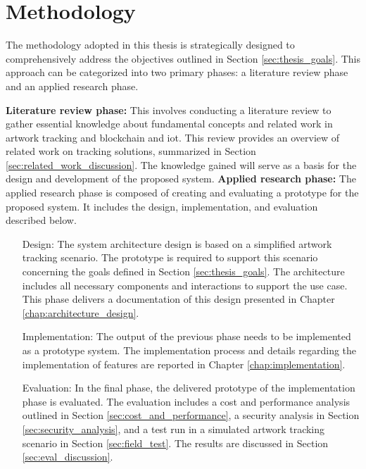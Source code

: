 \section{Methodology}
The methodology adopted in this thesis is strategically designed to comprehensively address the objectives outlined in Section \ref{sec:thesis_goals}. This approach can be categorized into two primary phases: a literature review phase and an applied research phase.

\textbf{Literature review phase:} This involves conducting a literature review to gather essential knowledge about fundamental concepts and related work in artwork tracking and blockchain and \gls{iot}. This review provides an overview of related work on tracking solutions, summarized in Section \ref{sec:related_work_discussion}. The knowledge gained will serve as a basis for the design and development of the proposed system.
\clearpage
\textbf{Applied research phase:} The applied research phase is composed of creating and evaluating a prototype for the proposed system. It includes the design, implementation, and evaluation described below.

\begin{itemize}[font=\itshape, align=left, itemindent=0.5cm]
    \item[Design:] The system architecture design is based on a simplified artwork tracking scenario. The prototype is required to support this scenario concerning the goals defined in Section \ref{sec:thesis_goals}. The architecture includes all necessary components and interactions to support the use case. This phase delivers a documentation of this design presented in Chapter \ref{chap:architecture_design}.
    \item[Implementation:] The output of the previous phase needs to be implemented as a prototype system. The implementation process and details regarding the implementation of features are reported in Chapter \ref{chap:implementation}. 
    \item[Evaluation:] In the final phase, the delivered prototype of the implementation phase is evaluated. The evaluation includes a cost and performance analysis outlined in Section \ref{sec:cost_and_performance}, a security analysis in Section \ref{sec:security_analysis}, and a test run in a simulated artwork tracking scenario in Section \ref{sec:field_test}. The results are discussed in Section \ref{sec:eval_discussion}.
\end{itemize}


